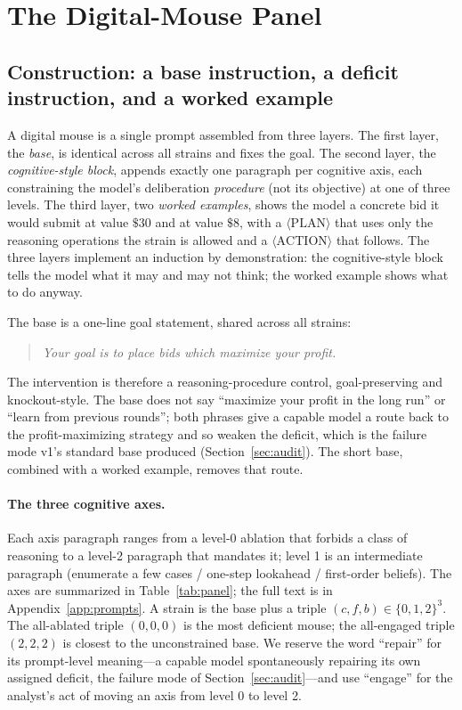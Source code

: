 \documentclass[12pt]{article}
\begin{document}
\section{The Digital-Mouse Panel}
\label{sec:panel}

\subsection{Construction: a base instruction, a deficit instruction,
and a worked example}

A digital mouse is a single prompt assembled from three layers. The
first layer, the \emph{base}, is identical across all strains and
fixes the goal. The second layer, the \emph{cognitive-style block},
appends exactly one paragraph per cognitive axis, each constraining
the model's deliberation \emph{procedure} (not its objective) at one
of three levels. The third layer, two \emph{worked examples}, shows
the model a concrete bid it would submit at value $\$30$ and at value
$\$8$, with a $\langle\mathrm{PLAN}\rangle$ that uses only the
reasoning operations the strain is allowed and a
$\langle\mathrm{ACTION}\rangle$ that follows. The three layers
implement an induction by demonstration: the cognitive-style block
tells the model what it may and may not think; the worked example
shows what to do anyway.

The base is a one-line goal statement, shared across all strains:
\begin{quote}\small\itshape
Your goal is to place bids which maximize your profit.
\end{quote}
The intervention is therefore a reasoning-procedure control,
goal-preserving and knockout-style. The base does not say
``maximize your profit in the long run'' or ``learn from previous
rounds''; both phrases give a capable model a route back to the
profit-maximizing strategy and so weaken the deficit, which is the
failure mode v1's standard base produced
(Section~\ref{sec:audit}). The short base, combined with a worked
example, removes that route.

\paragraph{The three cognitive axes.} Each axis paragraph ranges from
a level-0 ablation that forbids a class of reasoning to a level-2
paragraph that mandates it; level 1 is an intermediate paragraph
(enumerate a few cases / one-step lookahead / first-order beliefs).
The axes are summarized in Table~\ref{tab:panel}; the full text is in
Appendix~\ref{app:prompts}. A strain is the base plus a triple
$(c,f,b)\in\{0,1,2\}^3$. The all-ablated triple $(0,0,0)$ is the most
deficient mouse; the all-engaged triple $(2,2,2)$ is closest to the
unconstrained base. We reserve the word ``repair'' for its
prompt-level meaning---a capable model spontaneously repairing its own
assigned deficit, the failure mode of Section~\ref{sec:audit}---and use
``engage'' for the analyst's act of moving an axis from level 0 to
level 2.
\end{document}
